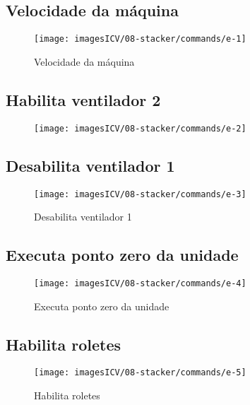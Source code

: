 \usepackage{graphicx}
\usepackage{wasysym}
\newpage
\thispagestyle{fancy}
\vspace{\fill}

\subsection{\small Velocidade da máquina}
\begin{figure}
    \centering
    \texttt{[image: imagesICV/08-stacker/commands/e-1]}
    \caption{Velocidade da máquina}
\end{figure}
\newpage

\thispagestyle{fancy}
\vspace{\fill}
\subsection{\small Habilita ventilador 2}
\begin{figure}
    \centering
    \texttt{[image: imagesICV/08-stacker/commands/e-2]}
    \caption{}
\end{figure}
\newpage

\thispagestyle{fancy}
\vspace{\fill}
\subsection{\small Desabilita ventilador 1}
\begin{figure}
    \centering
    \texttt{[image: imagesICV/08-stacker/commands/e-3]}
    \caption{Desabilita ventilador 1}
    \label{}
\end{figure}
\newpage

\thispagestyle{fancy}
\vspace{\fill}
\subsection{\small Executa ponto zero da unidade}
\begin{figure}
    \centering
    \texttt{[image: imagesICV/08-stacker/commands/e-4]}
    \caption{Executa ponto zero da unidade}
    \label{}
\end{figure}
\newpage

\thispagestyle{fancy}
\vspace{\fill}
\subsection{\small Habilita roletes}
\begin{figure}
    \centering
    \texttt{[image: imagesICV/08-stacker/commands/e-5]}
    \caption{Habilita roletes}
    \label{fig:}
\end{figure}
\newpage

